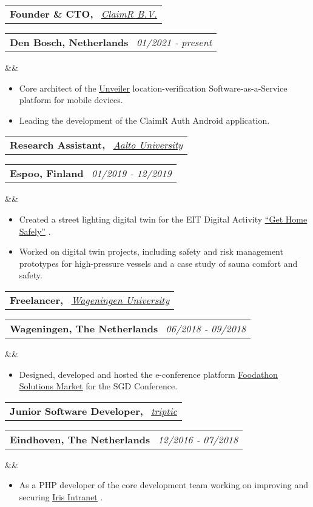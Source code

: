\documentclass[11pt,a4paper,sans]{moderncv}
\makeatletter
\newcommand*{\customcventry}[7][.13em]{
\begin{tabular}{@{}l}
{\bfseries #4} \
{\itshape #3}
\end{tabular}
\hfill
\begin{tabular}{l@{}}
{\bfseries #5} \
{\itshape #2}
\end{tabular}
\ifx&#7&%
\else{\
\begin{minipage}{\maincolumnwidth}%
\small#7%
\end{minipage}}\fi%
\par\addvspace{#1}}
\newcommand{\inlineLink}[2]{%
    \underline{\href{#1}{#2}}%
}
\makeatother
\begin{document}
\customcventry{01/2021 ‐ present}
    {{\color{blue}\href{https://claimr.tools}{ClaimR B.V.}}}
    {Founder \& CTO,}
    {Den Bosch, Netherlands}
    {}{}
    {
        \begin{itemize}[leftmargin=0.6cm, label={\textbullet}]
            \item Core architect of the {\inlineLink{https://unveiler.io}{Unveiler}} location-verification Software-as-a-Service platform for mobile devices. 
            \item Leading the development of the ClaimR Auth Android application.
        \end{itemize}
    }


\customcventry{01/2019 ‐ 12/2019}
    {{\color{blue}\href{https://www.aalto.fi/en}{Aalto University}}}
    {Research Assistant,}
    {Espoo, Finland}
    {}{}
    {
        \begin{itemize}[leftmargin=0.6cm, label={\textbullet}]
            \item Created a street lighting digital twin for the EIT Digital Activity \inlineLink{https://web.archive.org/web/20200805070817/https://cyphylab.chora.tu-berlin.de/gethomesafely/}{``Get Home Safely''}.
            \item Worked on digital twin projects, including safety and risk management prototypes for high-pressure vessels and a case study of sauna comfort and safety.
        \end{itemize}
    }

\customcventry{06/2018 ‐ 09/2018}
    {{\color{blue}\href{https://wur.nl/en}{Wageningen University}}}
    {Freelancer,}
    {Wageningen, The Netherlands}
    {}{}
    {
        \begin{itemize}[leftmargin=0.6cm, label={\textbullet}]
            \item Designed, developed and hosted the e-conference platform \inlineLink{https://foodathon.github.io/}{Foodathon Solutions Market} for the SGD Conference.
        \end{itemize}
    }

\customcventry{12/2016 ‐ 07/2018}
    {{\color{blue}\href{https://www.triptic.nl/}{triptic}}}
    {Junior Software Developer,}
    {Eindhoven, The Netherlands}
    {}{}
    {
        \begin{itemize}[leftmargin=0.6cm, label={\textbullet}]
            \item As a PHP developer of the core development team working on improving and securing \inlineLink{https://www.irisintranet.com/}{Iris Intranet}.
        \end{itemize}
    }
\end{document}
